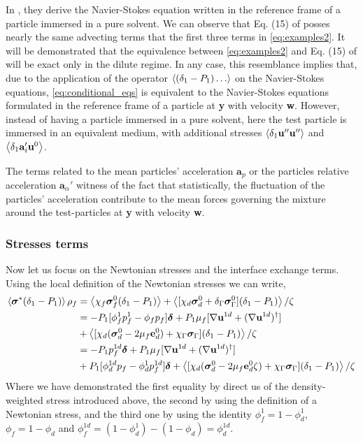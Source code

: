 In \citet{maxey1983equation}, they derive the Navier-Stokes equation written in the reference frame of a particle immersed in a pure solvent. 
We can observe that Eq. (15) of \citet{maxey1983equation} posses nearly the same advecting terms that the first three terms in \ref{eq:examples2}. 
It will be demonstrated that the equivalence between \ref{eq:examples2} and Eq. (15) of \citet{maxey1983equation} will be exact only in the dilute regime. 
In any case, this resemblance implies that, due to the application of the operator $\left<(\delta_1-P_1)\ldots\right>$ on the Navier-Stokes equations, \ref{eq:conditional_eqs} is equivalent to the Navier-Stokes equations formulated in the reference frame of a particle at \textbf{y} with velocity \textbf{w}.
However, instead of having a particle immersed in a pure solvent, here the test particle is immersed in an equivalent medium, with additional stresses $\left<\delta_1 \textbf{u}''\textbf{u}''\right>$ and $\left<\delta_1\textbf{a}_i' \textbf{u}^0\right>$. 


The terms related to the mean particles' acceleration $\textbf{a}_p$ or the particles relative acceleration $\textbf{a}_\alpha'$ witness of the fact that statistically, the fluctuation of the particles' acceleration contribute to the mean forces governing the mixture around the test-particles at \textbf{y} with velocity \textbf{w}. 

\subsubsection{Stresses terms}

Now let us focus on the Newtonian stresses and the interface exchange terms. 
Using the local definition of the Newtonian stresses we can write, 
\begin{align}
    \avg{\bm\sigma^* (\delta_1 - P_1)} \rho_f
    &= \avg{\chi_f \bm\sigma^0_f (\delta_1 - P_1)}
    + \avg{[\chi_d \bm\sigma^0_d  + \delta_\Gamma \bm\sigma^0_\Gamma] (\delta_1 - P_1)}/\zeta
    \nonumber \\
    &= 
    - P_1 [
        \phi_f^1 p_f^1
        - \phi_f p_f
    ]\bm\delta
    + P_1 \mu_f [\grad \textbf{u}^{1d}+(\grad \textbf{u}^{1d})^\dagger] \nonumber \\
    &+ \avg{[\chi_d (\bm\sigma_d^0 - 2 \mu_f \textbf{e}^0_d ) + \chi_\Gamma \bm\sigma_\Gamma ]  (\delta_1 - P_1)}/\zeta \nonumber \\
    &= 
    - P_1  p_f^{1d}\bm\delta
    \label{eq:equivalent_stress}
    + P_1 \mu_f [\grad \textbf{u}^{1d}+(\grad \textbf{u}^{1d})^\dagger] \\
    &+P_1 [\phi_d^{1d} p_f
    - \phi_d^1 p_f^{1d}]\bm\delta
    + \avg{[\chi_d (\bm\sigma_d^0 - 2 \mu_f \textbf{e}^0_d \zeta) + \chi_\Gamma \bm\sigma_\Gamma ]  (\delta_1 - P_1)} /\zeta \nonumber
\end{align}
Where we have demonstrated the first equality by direct us of the density-weighted stress introduced above, the second by using the definition of a Newtonian stress, and the third one by using the identity $\phi_f^1 =1  - \phi_d^1$, $\phi_f = 1 -\phi_d$ and $\phi_f^{1d} = (1 - \phi_d^1) - (1 - \phi_d) = \phi_d^{1d}$. 

